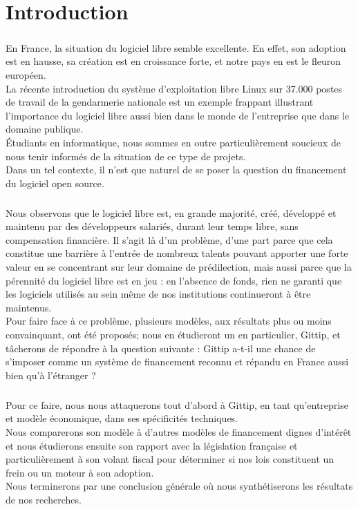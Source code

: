 \chapter*{Introduction}

\paragraph{}
En France, la situation du logiciel libre semble excellente.
En effet, son adoption est en hausse, sa création est en croissance forte,
et notre pays en est le fleuron européen.\\
La récente introduction du système d'exploitation libre Linux sur 37.000
postes de travail de la gendarmerie nationale est un exemple frappant
illustrant l'importance du logiciel libre aussi bien dans le monde de
l'entreprise que dans le domaine publique.\\
Étudiants en informatique, nous sommes en outre particulièrement soucieux
de nous tenir informés de la situation de ce type de projets.\\
Dans un tel contexte, il n'est que naturel de se poser la question du
financement du logiciel open source.

\paragraph{}
Nous observons que le logiciel libre est, en grande majorité, créé,
développé et maintenu par des développeurs salariés, durant leur temps
libre, sans compensation financière. Il s'agit là d'un problème, d'une
part parce que cela constitue une barrière à l'entrée de nombreux talents
pouvant apporter une forte valeur en se concentrant sur leur domaine de
prédilection, mais aussi parce que la pérennité du logiciel libre est en
jeu : en l'absence de fonds, rien ne garanti que les logiciels utilisés
au sein même de nos institutions continueront à être maintenus.\\
Pour faire face à ce problème, plusieurs modèles, aux résultats plus ou
moins convainquant, ont été proposés; nous en étudieront un en
particulier, Gittip, et tâcherons de répondre à la question suivante :
Gittip a-t-il une chance de s'imposer comme un système de financement
reconnu et répandu en France aussi bien qu'à l'étranger ?

\paragraph{}
Pour ce faire, nous nous attaquerons tout d'abord à Gittip, en tant
qu'entreprise et modèle économique, dans ses spécificités techniques.\\
Nous comparerons son modèle à d'autres modèles de financement
dignes d'intérêt et nous étudierons ensuite son rapport avec la législation
française et particulièrement à son volant fiscal pour déterminer si nos
lois constituent un frein ou un moteur à son adoption.\\
Nous terminerons par une conclusion générale où nous synthétiserons
les résultats de nos recherches.
